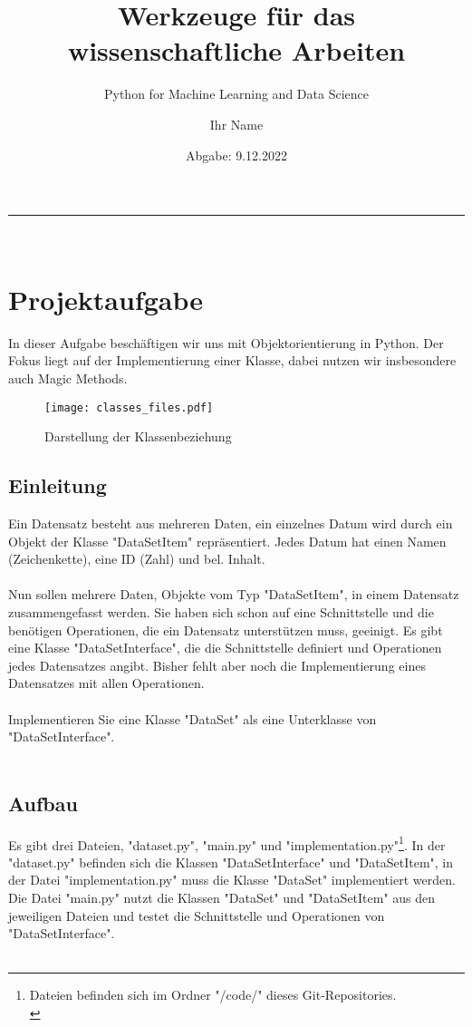 \documentclass[]{scrartcl}
\begin{document}
\title{Werkzeuge für das wissenschaftliche Arbeiten}
\subtitle{Python for Machine Learning and Data Science}
\author{Ihr Name}
\date{Abgabe: 9.12.2022}
\maketitle

\hrule\hfill\\[0.2cm]

\tableofcontents
\section{Projektaufgabe}
In dieser Aufgabe beschäftigen wir uns mit Objektorientierung in Python.
Der Fokus liegt auf der Implementierung einer Klasse, dabei nutzen wir insbesondere auch Magic Methods.\\
\begin{figure}[h]
    \centering
    \texttt{[image: classes\_files.pdf]}
    \caption{Darstellung der Klassenbeziehung}
    \label{fig:my_label}
\end{figure}

\subsection{Einleitung}
Ein Datensatz besteht aus mehreren Daten, ein einzelnes Datum wird durch ein Objekt der Klasse "DataSetItem" repräsentiert.
Jedes Datum hat einen Namen (Zeichenkette), eine ID (Zahl) und bel. Inhalt.\\
\\
Nun sollen mehrere Daten, Objekte vom Typ "DataSetItem", in einem Datensatz zusammengefasst werden.
Sie haben sich schon auf eine Schnittstelle und die benötigen Operationen, die ein Datensatz unterstützen muss, geeinigt.
Es gibt eine Klasse "DataSetInterface", die die Schnittstelle definiert und Operationen jedes Datensatzes angibt.
Bisher fehlt aber noch die Implementierung eines Datensatzes mit allen Operationen.\\
\\
Implementieren Sie eine Klasse "DataSet" als eine Unterklasse von "DataSetInterface".\\
\\
\subsection{Aufbau}
Es gibt drei Dateien, "dataset.py", "main.py" und "implementation.py"\footnote{Dateien befinden sich im Ordner "/code/" dieses Git-Repositories.\\}.
In der "dataset.py" befinden sich die Klassen "DataSetInterface" und "DataSetItem",
in der Datei "implementation.py" muss die Klasse "DataSet" implementiert werden.
Die Datei "main.py" nutzt die Klassen "DataSet" und "DataSetItem" aus den jeweiligen Dateien und testet die Schnittstelle und Operationen von "DataSetInterface".\\
\\
\end{document}
